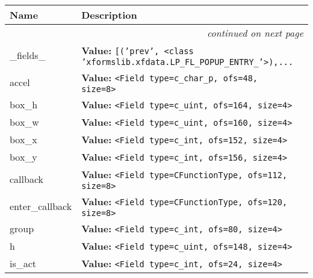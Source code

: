     \vspace{-1cm}
\hspace{\varindent}\begin{longtable}{|p{\varnamewidth}|p{\vardescrwidth}|l}
\cline{1-2}
\cline{1-2} \centering \textbf{Name} & \centering \textbf{Description}& \\
\cline{1-2}
\endhead\cline{1-2}\multicolumn{3}{r}{\small\textit{continued on next page}}\\\endfoot\cline{1-2}
\endlastfoot\raggedright \_\-f\-i\-e\-l\-d\-s\-\_\- & \raggedright \textbf{Value:} 
{\tt \texttt{[}\texttt{(}\texttt{'}\texttt{prev}\texttt{'}\texttt{, }{\textless}class 'xformslib.xfdata.LP\_FL\_POPUP\_ENTRY\_'{\textgreater}\texttt{)}\texttt{,}\texttt{...}}&\\
\cline{1-2}
\raggedright a\-c\-c\-e\-l\- & \raggedright \textbf{Value:} 
{\tt {\textless}Field type=c\_char\_p, ofs=48, size=8{\textgreater}}&\\
\cline{1-2}
\raggedright b\-o\-x\-\_\-h\- & \raggedright \textbf{Value:} 
{\tt {\textless}Field type=c\_uint, ofs=164, size=4{\textgreater}}&\\
\cline{1-2}
\raggedright b\-o\-x\-\_\-w\- & \raggedright \textbf{Value:} 
{\tt {\textless}Field type=c\_uint, ofs=160, size=4{\textgreater}}&\\
\cline{1-2}
\raggedright b\-o\-x\-\_\-x\- & \raggedright \textbf{Value:} 
{\tt {\textless}Field type=c\_int, ofs=152, size=4{\textgreater}}&\\
\cline{1-2}
\raggedright b\-o\-x\-\_\-y\- & \raggedright \textbf{Value:} 
{\tt {\textless}Field type=c\_int, ofs=156, size=4{\textgreater}}&\\
\cline{1-2}
\raggedright c\-a\-l\-l\-b\-a\-c\-k\- & \raggedright \textbf{Value:} 
{\tt {\textless}Field type=CFunctionType, ofs=112, size=8{\textgreater}}&\\
\cline{1-2}
\raggedright e\-n\-t\-e\-r\-\_\-c\-a\-l\-l\-b\-a\-c\-k\- & \raggedright \textbf{Value:} 
{\tt {\textless}Field type=CFunctionType, ofs=120, size=8{\textgreater}}&\\
\cline{1-2}
\raggedright g\-r\-o\-u\-p\- & \raggedright \textbf{Value:} 
{\tt {\textless}Field type=c\_int, ofs=80, size=4{\textgreater}}&\\
\cline{1-2}
\raggedright h\- & \raggedright \textbf{Value:} 
{\tt {\textless}Field type=c\_uint, ofs=148, size=4{\textgreater}}&\\
\cline{1-2}
\raggedright i\-s\-\_\-a\-c\-t\- & \raggedright \textbf{Value:} 
{\tt {\textless}Field type=c\_int, ofs=24, size=4{\textgreater}}&\\

\end{longtable}
